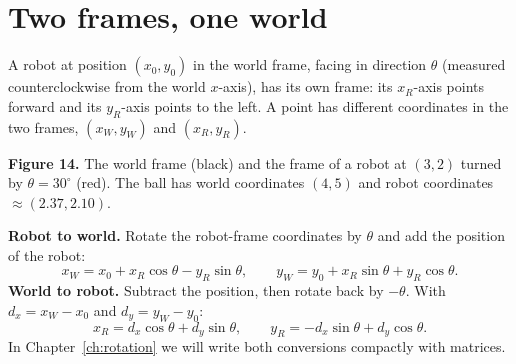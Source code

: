 \label{ch:frames}

\section*{Two frames, one world}
A robot at position $(x_0,y_0)$ in the world frame, facing in direction $\theta$ (measured counterclockwise from the world $x$-axis), has its own frame: its $x_R$-axis points forward and its $y_R$-axis points to the left. A point has different coordinates in the two frames, $(x_W,y_W)$ and $(x_R,y_R)$.

\begin{center}

\small\textbf{Figure 14.} The world frame (black) and the frame of a robot at $(3,2)$ turned by $\theta=30^\circ$ (red). The ball has world coordinates $(4,5)$ and robot coordinates $\approx(2.37,2.10)$.
\end{center}

\textbf{Robot to world.} Rotate the robot-frame coordinates by $\theta$ and add the position of the robot:
\[
x_W=x_0+x_R\cos\theta-y_R\sin\theta,\qquad
y_W=y_0+x_R\sin\theta+y_R\cos\theta.
\]
\textbf{World to robot.} Subtract the position, then rotate back by $-\theta$. With $d_x=x_W-x_0$ and $d_y=y_W-y_0$:
\[
x_R=d_x\cos\theta+d_y\sin\theta,\qquad
y_R=-d_x\sin\theta+d_y\cos\theta.
\]
In Chapter~\ref{ch:rotation} we will write both conversions compactly with matrices.


